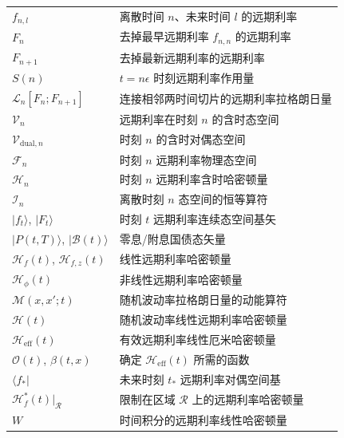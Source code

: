 \begin{center}
\begin{tabular}{@{}L{3.2cm}L{10.6cm}@{}}
\toprule
$f_{n,l}$ & 离散时间 $n$、未来时间 $l$ 的远期利率 \\
$F_n$ & 去掉最早远期利率 $f_{n,n}$ 的远期利率 \\
$F_{n+1}$ & 去掉最新远期利率的远期利率 \\
$S(n)$ & $t=n\epsilon$ 时刻远期利率作用量 \\
$\mathcal{L}_n[F_n;F_{n+1}]$ & 连接相邻两时间切片的远期利率拉格朗日量 \\
$\mathcal{V}_n$ & 远期利率在时刻 $n$ 的含时态空间 \\
$\mathcal{V}_{\mathrm{dual},n}$ & 时刻 $n$ 的含时对偶态空间 \\
$\mathcal{F}_n$ & 时刻 $n$ 远期利率物理态空间 \\
$\mathcal{H}_n$ & 时刻 $n$ 远期利率含时哈密顿量 \\
$\mathcal{I}_n$ & 离散时刻 $n$ 态空间的恒等算符 \\
$\vert f_t\rangle$, $\vert F_t\rangle$ & 时刻 $t$ 远期利率连续态空间基矢 \\
$\vert P(t,T)\rangle$, $\vert\mathcal{B}(t)\rangle$ & 零息/附息国债态矢量 \\
$\mathcal{H}_f(t)$, $\mathcal{H}_{f,z}(t)$ & 线性远期利率哈密顿量 \\
$\mathcal{H}_{\phi}(t)$ & 非线性远期利率哈密顿量 \\
$\mathcal{M}(x,x';t)$ & 随机波动率拉格朗日量的动能算符 \\
$\mathcal{H}(t)$ & 随机波动率线性远期利率哈密顿量 \\
$\mathcal{H}_{\mathrm{eff}}(t)$ & 有效远期利率线性厄米哈密顿量 \\
$\mathcal{O}(t)$, $\beta(t,x)$ & 确定 $\mathcal{H}_{\mathrm{eff}}(t)$ 所需的函数 \\
$\langle f_*\vert$ & 未来时刻 $t_*$ 远期利率对偶空间基 \\
$\mathcal{H}_f^*(t)\vert_{\mathcal{R}}$ & 限制在区域 $\mathcal{R}$ 上的远期利率哈密顿量 \\
$W$ & 时间积分的远期利率线性哈密顿量 \\
\bottomrule
\end{tabular}
\end{center}
